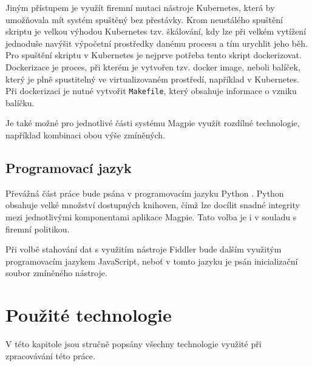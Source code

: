 \documentclass[thesis=M,czech,hidelinks]{FITthesis}[2013/05/06]
\begin{document}
Jiným přístupem je využít firemní mutaci nástroje Kubernetes, která by umožňovala mít systém spuštěný bez přestávky. Krom neustálého spuštění skriptu je velkou výhodou Kubernetes tzv. škálování, kdy lze při velkém vytížení jednoduše navýšit výpočetní prostředky danému procesu a tím urychlit jeho běh. Pro spuštění skriptu v Kubernetes je nejprve potřeba tento skript dockerizovat. Dockerizace je proces, při kterém je vytvořen tzv. docker image, neboli balíček, který je plně spustitelný ve virtualizovaném prostředí, například v Kubernetes. Při dockerizaci je nutné vytvořit \texttt{Makefile}, který obsahuje informace o vzniku balíčku. 

Je také možné pro jednotlivé části systému Magpie využít rozdílné technologie, například kombinaci obou výše zmíněných.

\section{Programovací jazyk}
Převážná část práce bude psána v programovacím jazyku Python \cite{python}. Python obsahuje velké množství dostupných knihoven, čímž lze docílit snadné integrity mezi jednotlivými komponentami aplikace Magpie. Tato volba je i v souladu s firemní politikou. 

Při volbě stahování dat s využitím nástroje Fiddler bude dalším využitým programovacím jazykem JavaScript, neboť v tomto jazyku je psán inicializační soubor zmíněného nástroje.
















\chapter{Použité technologie}
V této kapitole jsou stručně popsány všechny technologie využité při zpracovávání této práce.
\end{document}

